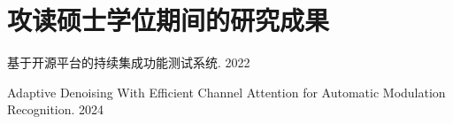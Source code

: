 \chapter{攻读硕士学位期间的研究成果}

\begin{enumerate}[label = {[\arabic*]}]
    \item 基于开源平台的持续集成功能测试系统. 2022
    \item Adaptive Denoising With Efficient Channel Attention for Automatic Modulation Recognition. 2024
\end{enumerate}






